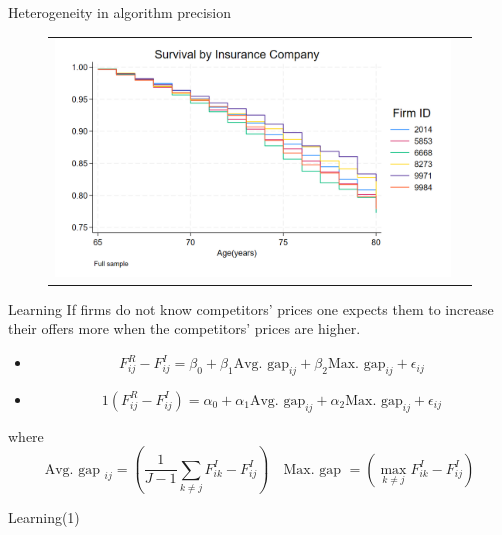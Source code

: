 \documentclass[10pt,aspectratio=169]{beamer}
\begin{document}
\begin{frame}{Heterogeneity in algorithm precision}\label{slide:fig3}    
\begin{figure}[H]
\centering{}%
\begin{tabular}{cc}
\includegraphics[scale=0.2964]{../figures/IE6/IE6_survival_year_all.png}
\end{tabular}
\end{figure}
\hyperlink{slide:Descriptive_evidence}{}
\end{frame}


\begin{frame}{Learning} 
    If firms do not know competitors' prices one expects them to increase their offers more when the competitors' prices are higher. 
    \begin{itemize}
        \item $$ F_{ij}^R - F_{ij}^I = \beta_0 + \beta_1 \text{Avg. gap}_{ij} + \beta_2 \text{Max. gap}_{ij} + \epsilon_{ij}$$

        \item $$ 1(F_{ij}^R  - F_{ij}^I)  = \alpha_0 + \alpha_1 \text{Avg. gap}_{ij} + \alpha_2 \text{Max. gap}_{ij} + \epsilon_{ij}$$
    \end{itemize}
    where  $$ \text{Avg. gap }_{ij} = \left(\frac{1}{J-1}\sum_{k \neq j} F_{ik}^I - F_{ij}^I\right) \quad \text{Max. gap } = \left(\max_{k \neq j} F_{ik}^I - F_{ij}^I\right)$$
    
\end{frame}


\begin{frame}{Learning(1)}\label{slide:fig4}    
\scalebox{0.8}{
    
}

\hyperlink{slide:Descriptive_evidence}{}
\end{frame}
\end{document}

